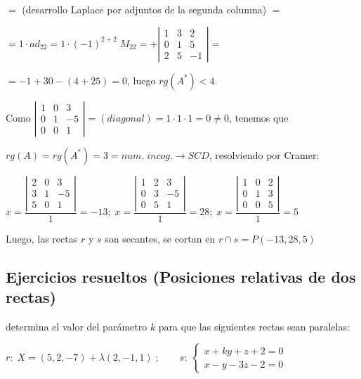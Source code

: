 $=$ (desarrollo Laplace por adjuntos de la segunda columna) $=$

$=1\cdot ad_{22}=1\cdot (-1)^{2+2}\; M_{22}=  +\left| \begin{matrix} 1&3&2\\0&1&5\\2&5&-1  \end{matrix} \right|=$

$=-1+30-(4+25)=0$, luego $rg(A^*)<4$.

Como $\left| \begin{matrix} 1&0&3\\0&1&-5\\0&0&1  \end{matrix} \right|=(diagonal)=1\cdot 1\cdot 1=0\neq 0$, tenemos que 

$rg(A)=rg(A^*)=3=num.\; incog. \to SCD$, resolviendo por Cramer:


\small{$x=\dfrac{\left| \begin{matrix} 2&0&3\\3&1&-5\\5&0&1  \end{matrix} \right|}{1}=-13; \;x=\dfrac{\left| \begin{matrix} 1&2&3\\0&3&-5\\0&5&1  \end{matrix} \right|}{1}=28; \;x=\dfrac{\left| \begin{matrix} 1&0&2\\0&1&3\\0&0&5  \end{matrix} \right|}{1}=5$}\normalsize{\textcolor{white}{.}}

Luego, las rectas $r$ y $s$ son secantes, se cortan en $r\cap s=P(-13,28,5)$

\subsection{Ejercicios resueltos (Posiciones relativas de dos rectas)}

\begin{ejre} determina el valor del parámetro $k$ para que las siguientes rectas sean paralelas:

$r:\; X=(5,2,-7)+\lambda (2,-1,1)\;; \qquad s:\; \begin{cases} x+ky+z+2=0\\x-y-3z-2=0 \end{cases}$	
\end{ejre}

